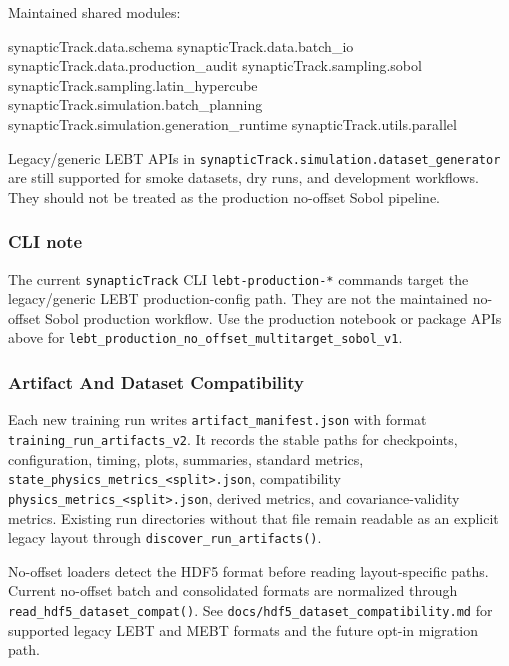 \documentclass[
]{article}
\newenvironment{Shaded}{}{}
\newcommand{\NormalTok}[1]{#1}
\begin{document}
Maintained shared modules:

\begin{Shaded}
\begin{Highlighting}[]
\NormalTok{synapticTrack.data.schema}
\NormalTok{synapticTrack.data.batch\_io}
\NormalTok{synapticTrack.data.production\_audit}
\NormalTok{synapticTrack.sampling.sobol}
\NormalTok{synapticTrack.sampling.latin\_hypercube}
\NormalTok{synapticTrack.simulation.batch\_planning}
\NormalTok{synapticTrack.simulation.generation\_runtime}
\NormalTok{synapticTrack.utils.parallel}
\end{Highlighting}
\end{Shaded}

Legacy/generic LEBT APIs in
\texttt{synapticTrack.simulation.dataset\_generator} are still supported
for smoke datasets, dry runs, and development workflows. They should not
be treated as the production no-offset Sobol pipeline.

\hypertarget{cli-note}{%
\subsubsection{CLI note}\label{cli-note}}

The current \texttt{synapticTrack} CLI \texttt{lebt-production-*}
commands target the legacy/generic LEBT production-config path. They are
not the maintained no-offset Sobol production workflow. Use the
production notebook or package APIs above for
\texttt{lebt\_production\_no\_offset\_multitarget\_sobol\_v1}.

\hypertarget{artifact-and-dataset-compatibility}{%
\subsubsection{Artifact And Dataset
Compatibility}\label{artifact-and-dataset-compatibility}}

Each new training run writes \texttt{artifact\_manifest.json} with
format \texttt{training\_run\_artifacts\_v2}. It records the stable
paths for checkpoints, configuration, timing, plots, summaries, standard
metrics,
\texttt{state\_physics\_metrics\_\textless{}split\textgreater{}.json},
compatibility
\texttt{physics\_metrics\_\textless{}split\textgreater{}.json}, derived
metrics, and covariance-validity metrics. Existing run directories
without that file remain readable as an explicit legacy layout through
\texttt{discover\_run\_artifacts()}.

No-offset loaders detect the HDF5 format before reading layout-specific
paths. Current no-offset batch and consolidated formats are normalized
through \texttt{read\_hdf5\_dataset\_compat()}. See
\texttt{docs/hdf5\_dataset\_compatibility.md} for supported legacy LEBT
and MEBT formats and the future opt-in migration path.
\end{document}
